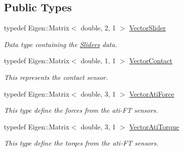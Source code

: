 \subsection*{Public Types}
\begin{DoxyCompactItemize}
\item 
typedef Eigen\+::\+Matrix$<$ double, 2, 1 $>$ \hyperlink{classblmc__robots_1_1Teststand_a201214fc01f68b97ceba62af3fb8cccf}{Vector\+Slider}\hypertarget{classblmc__robots_1_1Teststand_a201214fc01f68b97ceba62af3fb8cccf}{}\label{classblmc__robots_1_1Teststand_a201214fc01f68b97ceba62af3fb8cccf}

\begin{DoxyCompactList}\small\item\em Data type containing the \hyperlink{classblmc__robots_1_1Sliders}{Sliders} data. \end{DoxyCompactList}\item 
typedef Eigen\+::\+Matrix$<$ double, 1, 1 $>$ \hyperlink{classblmc__robots_1_1Teststand_a23b0a73bc99ce4a3588204b7480eb6d7}{Vector\+Contact}\hypertarget{classblmc__robots_1_1Teststand_a23b0a73bc99ce4a3588204b7480eb6d7}{}\label{classblmc__robots_1_1Teststand_a23b0a73bc99ce4a3588204b7480eb6d7}

\begin{DoxyCompactList}\small\item\em This represents the contact sensor. \end{DoxyCompactList}\item 
typedef Eigen\+::\+Matrix$<$ double, 3, 1 $>$ \hyperlink{classblmc__robots_1_1Teststand_a51f17cf2b01dd8252e21db97b486e067}{Vector\+Ati\+Force}\hypertarget{classblmc__robots_1_1Teststand_a51f17cf2b01dd8252e21db97b486e067}{}\label{classblmc__robots_1_1Teststand_a51f17cf2b01dd8252e21db97b486e067}

\begin{DoxyCompactList}\small\item\em This type define the forces from the ati-\/\+FT sensors. \end{DoxyCompactList}\item 
typedef Eigen\+::\+Matrix$<$ double, 3, 1 $>$ \hyperlink{classblmc__robots_1_1Teststand_a466977786f9b007854fa2eb2a97b0de9}{Vector\+Ati\+Torque}\hypertarget{classblmc__robots_1_1Teststand_a466977786f9b007854fa2eb2a97b0de9}{}\label{classblmc__robots_1_1Teststand_a466977786f9b007854fa2eb2a97b0de9}

\begin{DoxyCompactList}\small\item\em This type define the torqes from the ati-\/\+FT sensors. \end{DoxyCompactList}\end{DoxyCompactItemize}
